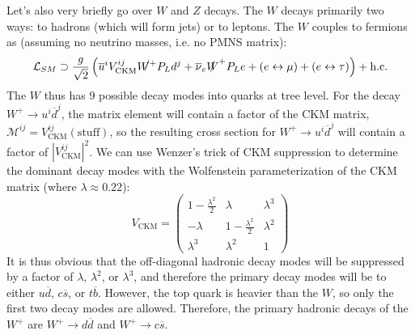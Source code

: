 \documentclass[11pt, oneside]{article}   	%
\theoremstyle{definition}
\numberwithin{equation}{subsection}		%
\begin{document}
Let's also very briefly go over $W$ and $Z$ decays. The $W$ decays primarily two ways: to hadrons (which will form jets) or to leptons. 
The $W$ couples to fermions as (assuming no neutrino masses, i.e. no PMNS matrix):
\begin{equation}
	\mathcal L_{SM}\supset \frac{g}{\sqrt 2}\left(\overline u^i V_\mathrm{CKM}^{ij}\slashed{W^+} P_L d^j + \overline\nu_e \slashed W^+ P_L e + (e\leftrightarrow\mu) + (e\leftrightarrow\tau)\right) + \mathrm{h.c.}
\end{equation}
The $W$ thus has 9 possible decay modes into quarks at tree level. For the decay $W^+\rightarrow u^i\overline d^j$, the matrix element 
will contain a factor of the CKM matrix, $\mathcal M^{ij} = V_\mathrm{CKM}^{ij}(\mathrm{stuff})$, so the resulting cross section for 
$W^+\rightarrow u^i \overline d^j$ will contain a factor of $|V_\mathrm{CKM}^{ij}|^2$. We can use Wenzer's trick of CKM suppression to 
determine the dominant decay modes with the Wolfenstein parameterization of the CKM matrix (where $\lambda\approx 0.22$):
\begin{equation}
	V_\mathrm{CKM} = \begin{pmatrix} 1 - \frac{\lambda^2}{2} & \lambda & \lambda^3 \\
	-\lambda & 1 - \frac{\lambda^2}{2} & \lambda^2 \\
	\lambda^3 & \lambda^2 & 1
	\end{pmatrix}
\end{equation}
It is thus obvious that the off-diagonal hadronic decay modes will be suppressed by a factor of $\lambda$, $\lambda^2$, or $\lambda^3$, and 
therefore the primary decay modes will be to either $u\overline d$, $c\overline s$, or $t\overline b$. However, the top quark is heavier than 
the $W$, so only the first two decay modes are allowed. Therefore, the primary hadronic decays of the $W^+$ are $W^+\rightarrow d
\overline d$ and $W^+\rightarrow c\overline s$. 
\end{document}
